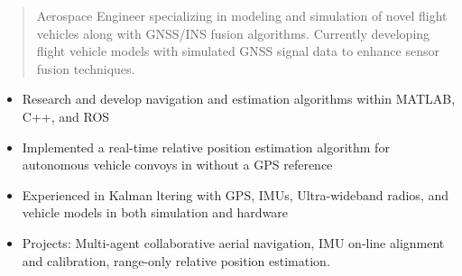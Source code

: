 \documentclass[10pt,a4paper,ragged2e,withhyper]{altacv}
\begin{document}
\begin{paracol}{2}



  \newpage

  \switchcolumn

  \begin{quote}
    Aerospace Engineer specializing in modeling and simulation of novel flight vehicles along with GNSS/INS fusion algorithms. Currently developing flight vehicle models with simulated GNSS signal data to enhance sensor fusion techniques.
  \end{quote}


  \begin{itemize}
    \item Research and develop navigation and estimation algorithms within MATLAB, C++, and ROS
    \item Implemented a real-time relative position estimation algorithm for autonomous vehicle convoys in
          without a GPS reference
    \item Experienced in Kalman
          ltering with GPS, IMUs, Ultra-wideband radios, and vehicle models in
          both simulation and hardware
    \item Projects: Multi-agent collaborative aerial navigation, IMU on-line alignment and calibration,
          range-only relative position estimation.
  \end{itemize}
  \divider


\end{paracol}
\end{document}
